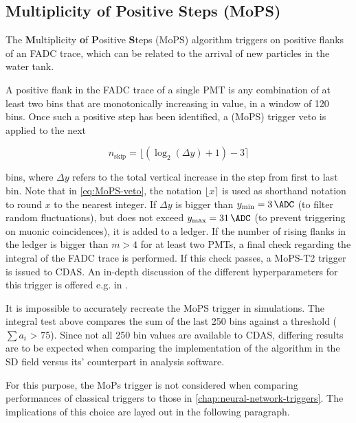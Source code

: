 \subsection{Multiplicity of Positive Steps (MoPS)}
\label{ssec:multiplicity-of-positive-steps}

The \textbf{M}ultiplicity \textbf{o}f \textbf{P}ositive \textbf{S}teps (MoPS) algorithm triggers on positive flanks of an FADC trace, which can be related to the 
arrival of new particles in the water tank. 

A positive flank in the FADC trace of a single PMT is any combination of at least two bins that are monotonically increasing in value, in a window of 120 bins. 
Once such a positive step has been identified, a (MoPS) trigger veto is applied to the next 

\begin{equation}
    \label{eq:MoPS-veto}
    n_\text{skip} = \lfloor \left( \log_2(\Delta y) + 1 \right) - 3\rceil
\end{equation}

bins, where $\Delta y$ refers to the total vertical increase in the step from first to last bin. Note that in \autoref{eq:MoPS-veto}, the notation 
$\lfloor x \rceil$ is used as shorthand notation to round $x$ to the nearest integer. If $\Delta y$ is bigger than $y_\text{min} = \SI{3}{\ADC}$ (to filter random 
fluctuations), but does not exceed $y_\text{max} = \SI{31}{\ADC}$ (to prevent triggering on muonic coincidences), it is added to a ledger. If the number of rising 
flanks in the ledger is bigger than $m>4$ for at least two PMTs, a final check regarding the integral of the FADC trace is performed. If this check passes, a 
MoPS-T2 trigger is issued to CDAS. An in-depth discussion of the different hyperparameters for this trigger is offered e.g. in \cite{gapMoPS}.

It is impossible to accurately recreate the MoPS trigger in simulations. The integral test above compares the sum of the last 250 bins against a threshold 
($\sum a_i$ > 75). Since not all 250 bin values are available to CDAS, differing results are to be expected when comparing the implementation of the algorithm in 
the SD field versus its' counterpart in analysis software. 

For this purpose, the MoPs trigger is not considered when comparing performances of classical triggers to those in \autoref{chap:neural-network-triggers}. The 
implications of this choice are layed out in the following paragraph.

